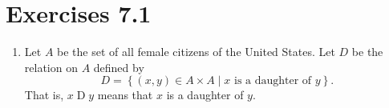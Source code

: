 \section*{Exercises 7.1}
%
\begin{enumerate}
\xitem Let  $A = \left\{ {a, b, c} \right\}$, $B = \left\{ {p, q, r} \right\}$, and let $R$ be the set of ordered pairs defined by 
$R = \left\{ {\left( {a, p} \right), \left( {b, q} \right), \left( {c, p} \right), \left( {a, q} \right)} \right\}$. 
\label{exer:sec71-1}%
\begin{enumerate}
  \item Use the roster method to list all the elements of  $A \times B$.  Explain why  
        $A \times B$  can be  considered to be a relation from  $A$  to  $B$.

  \item Explain why  $R$  is a relation from  $A$  to  $B$.  

  \item What is the domain of  $R$?  What is the range of  $R$?

\end{enumerate}


\xitem Let  $A = \left\{ {a, b, c} \right\}$ and let  
$R = \left\{ {\left( {a, a} \right), \left( {a, c} \right), \left( {b, b} \right), \left( {b, c} \right), \left( {c, a} \right), \left( {c, b} \right)} \right\}$ (so $R$ is a relation on $A$). \label{exer:sec71-2}
Are the following statements true or false?  Explain. 
\begin{enumerate}
  \item For each  $x \in A$, $x \mathrel{R} x$.

  \item For every  $x, y \in A$,  if  $x \mathrel{R} y$, then  $y \mathrel{R} x$.

  \item For every  $x, y, z \in A$, if  $x \mathrel{R} y$  and  $y \mathrel{R} z$, then  
        $x \mathrel{R} z$.

  \item $R$ is a function from  $A$  to  $A$.
\end{enumerate}


\item Let  $A$  be the set of all female citizens of the United States.  Let  $D$  be the relation on  $A$  defined by
\[
D = \left\{ { {\left( {x, y} \right) \in A \times A } \mid x\text{  is a daughter of  }y} \right\}\!.
\]
That is,  $x \mathrel{D} y$ means that  $x$  is a daughter of  $y$. \label{exer:sec71-3}


\end{enumerate}
